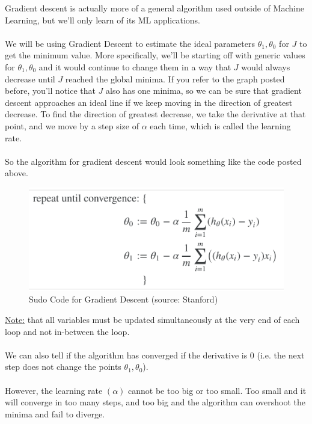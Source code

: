 \documentclass[12pt]{article}
\begin{document}
Gradient descent is actually more of a general algorithm used outside of Machine Learning, but we'll only learn of its ML applications.\\
\\
We will be using Gradient Descent to estimate the ideal parameters $\theta_1, \theta_0$ for $J$ to get the minimum value. More specifically, we'll be starting off with generic values for $\theta_1, \theta_0$ and it would continue to change them in a way that $J$ would always decrease until $J$ reached the global minima. If you refer to the graph posted before, you'll notice that $J$ also has one minima, so we can be sure that gradient descent approaches an ideal line if we keep moving in the direction of greatest decrease. To find the direction of greatest decrease, we take the derivative at that point, and we move by a step size of $\alpha$ each time, which is called the learning rate.\\
\\
So the algorithm for gradient descent would look something like the code posted above.

\begin{figure}
  \includegraphics[width=\linewidth]{GD.png}
  \caption{Sudo Code for Gradient Descent (source: Stanford)}
\end{figure}

\underline{Note:} that all variables must be updated simultaneously at the very end of each loop and not in-between the loop.\\
\\
We can also tell if the algorithm has converged if the derivative is 0 (i.e. the next step does not change the points $\theta_1, \theta_0$).\\
\\
However, the learning rate $(\alpha)$ cannot be too big or too small. Too small and it will converge in too many steps, and too big and the algorithm can overshoot the minima and fail to diverge.
\end{document}
